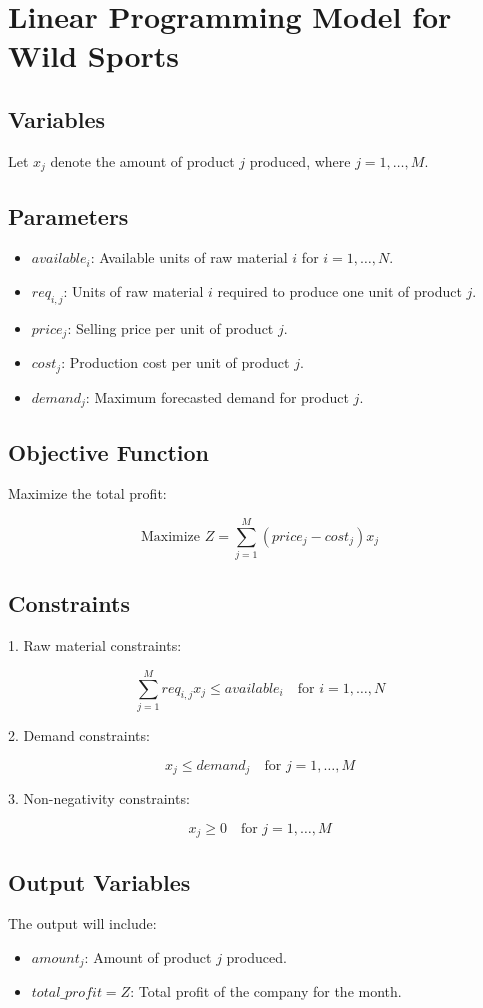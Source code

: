 \documentclass{article}
\begin{document}
\section*{Linear Programming Model for Wild Sports}

\subsection*{Variables}
Let \( x_j \) denote the amount of product \( j \) produced, where \( j = 1, \ldots, M \).

\subsection*{Parameters}
\begin{itemize}
    \item \( available_i \): Available units of raw material \( i \) for \( i = 1, \ldots, N \).
    \item \( req_{i,j} \): Units of raw material \( i \) required to produce one unit of product \( j \).
    \item \( price_j \): Selling price per unit of product \( j \).
    \item \( cost_j \): Production cost per unit of product \( j \).
    \item \( demand_j \): Maximum forecasted demand for product \( j \).
\end{itemize}

\subsection*{Objective Function}
Maximize the total profit:

\[
\text{Maximize } Z = \sum_{j=1}^{M} (price_j - cost_j) x_j
\]

\subsection*{Constraints}
1. Raw material constraints:

\[
\sum_{j=1}^{M} req_{i,j} x_j \leq available_i \quad \text{for } i = 1, \ldots, N
\]

2. Demand constraints:

\[
x_j \leq demand_j \quad \text{for } j = 1, \ldots, M
\]

3. Non-negativity constraints:

\[
x_j \geq 0 \quad \text{for } j = 1, \ldots, M
\]

\subsection*{Output Variables}
The output will include:
\begin{itemize}
    \item \( amount_j \): Amount of product \( j \) produced.
    \item \( total\_profit = Z \): Total profit of the company for the month.
\end{itemize}
\end{document}

